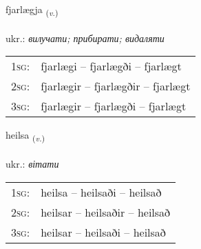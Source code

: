 \documentclass[frontgrid, backgrid]{flacards}\usepackage[]{graphicx}\usepackage[]{xcolor}
\begin{document}
\renewcommand{\flhead}{\vskip5pt \fboxsep=0pt {\small\bfseries\footnotesize Sagnorð | дієслово}}
\renewcommand{\fcfoot}{\vskip5pt \fboxsep=0pt \hspace{2pt}{\small\bfseries\footnotesize 3K}}

\renewcommand{\blhead}{\vskip5pt {\small\bfseries\footnotesize Sagnorð | дієслово }}
\renewcommand{\bcfoot}{\vskip5pt \hspace{2pt}{\small\bfseries\footnotesize 3K}}


{fjarlægja \small{\textsubscript{(\textit{v.})}} \\[1ex] %
\textphonetic{[fjarlaija]} \\
ukr.: \emph{вилучати; прибирати; видаляти} \\  [2ex]
\renewcommand*{\arraystretch}{0.8}
\begin{tabular}{p{1cm}l}
\textsc{1sg}: & fjarlægi -- fjarlægði -- fjarlægt \\ 
\textsc{2sg}: & fjarlægir -- fjarlægðir -- fjarlægt \\ 
\textsc{3sg}: & fjarlægir -- fjarlægði -- fjarlægt \\ 
\end{tabular}
}

\renewcommand{\flhead}{\vskip5pt \fboxsep=0pt {\small\bfseries\footnotesize Sagnorð | дієслово}}
\renewcommand{\fcfoot}{\vskip5pt \fboxsep=0pt \hspace{2pt}{\small\bfseries\footnotesize 3K}}

\renewcommand{\blhead}{\vskip5pt {\small\bfseries\footnotesize Sagnorð | дієслово }}
\renewcommand{\bcfoot}{\vskip5pt \hspace{2pt}{\small\bfseries\footnotesize 3K}}


{heilsa \small{\textsubscript{(\textit{v.})}} \\[1ex] %
\textphonetic{[heilsa]} \\
ukr.: \emph{вітати} \\  [2ex]
\renewcommand*{\arraystretch}{0.8}
\begin{tabular}{p{1cm}l}
\textsc{1sg}: & heilsa -- heilsaði -- heilsað \\ 
\textsc{2sg}: & heilsar -- heilsaðir -- heilsað \\ 
\textsc{3sg}: & heilsar -- heilsaði -- heilsað \\ 
\end{tabular}
}
\end{document}
